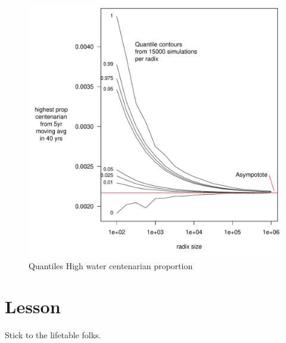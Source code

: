\documentclass[12pt,oneside,a4paper]{article} %
\theoremstyle{definition}
\begin{document}
\begin{figure}
\centering
\includegraphics[scale = .8]{Figures/SimJPNf2010.pdf}
\caption{Quantiles High water centenarian proportion}
\end{figure}

\section{Lesson}
Stick to the lifetable folks.

 
%
 
\end{document}

